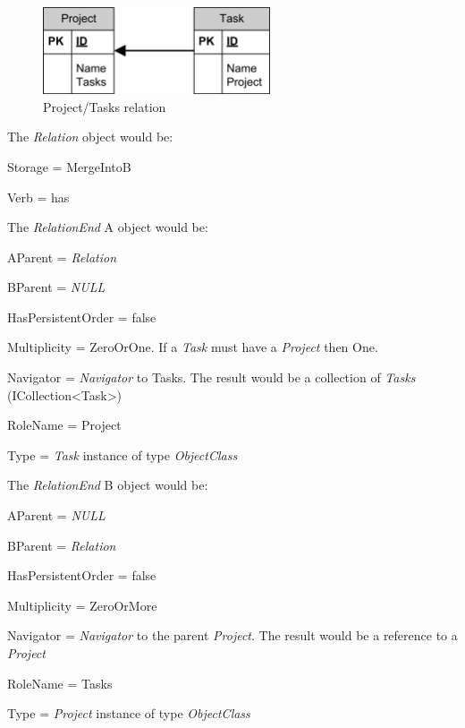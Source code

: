 \begin{figure}[ht]
	\begin{center}
		\includegraphics[width=0.6\textwidth]{images/Rel_1_n_Project_Tasks.png}
		\caption{Project/Tasks relation}
		\label{project_tasks_relation}
	\end{center}
\end{figure}

The \emph{Relation} object would be:
\begin{descriptionBorder}
	\item[Storage] 		{ = MergeIntoB }
	\item[Verb] 		{ = has }
\end{descriptionBorder}

The \emph{RelationEnd} A object would be:
\begin{descriptionBorder}
	\item[AParent] { = \emph{Relation}  }
	\item[BParent] { = \emph{NULL} }
	\item[HasPersistentOrder] { = false  }
	\item[Multiplicity] { = ZeroOrOne. If a \emph{Task} must have a \emph{Project} then One. }
	\item[Navigator] { = \emph{Navigator} to Tasks. The result would be a collection of \emph{Tasks} (ICollection\textless Task\textgreater) }
	\item[RoleName] { = Project }
	\item[Type] { = \emph{Task} instance of type \emph{ObjectClass} }
\end{descriptionBorder}

The \emph{RelationEnd} B object would be:
\begin{descriptionBorder}
	\item[AParent] { =  \emph{NULL} }
	\item[BParent] { = \emph{Relation} }
	\item[HasPersistentOrder] { = false  }
	\item[Multiplicity] { = ZeroOrMore }
	\item[Navigator] { = \emph{Navigator} to the parent \emph{Project}. The result would be a reference to a \emph{Project}  }
	\item[RoleName] { = Tasks }
	\item[Type] { = \emph{Project} instance of type \emph{ObjectClass} }
\end{descriptionBorder}

